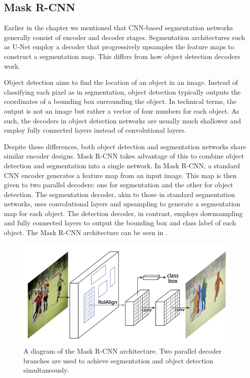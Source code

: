 \subsection{Mask R-CNN}

Earlier in the chapter we mentioned that CNN-based segmentation networks generally consist of encoder and decoder stages. Segmentation architectures such as U-Net employ a decoder that progressively upsamples the feature maps to construct a segmentation map. This differs from how object detection decoders work.

Object detection aims to find the location of an object in an image. Instead of classifying each pixel as in segmentation, object detection typically outputs the coordinates of a bounding box surrounding the object. In technical terms, the output is not an image but rather a vector of four numbers for each object. As such, the decoders in object detection networks are usually much shallower and employ fully connected layers instead of convolutional layers.

Despite these differences, both object detection and segmentation networks share similar encoder designs. Mask R-CNN \cite{heMaskRCNN2017b} takes advantage of this to combine object detection and segmentation into a single network. In Mask R-CNN, a standard CNN encoder generates a feature map from an input image. This map is then given to two parallel decoders: one for segmentation and the other for object detection. The segmentation decoder, akin to those in standard segmentation networks, uses convolutional layers and upsampling to generate a segmentation map for each object. The detection decoder, in contrast, employs downsampling and fully connected layers to output the bounding box and class label of each object. The Mask R-CNN architecture can be seen in .

 \begin{figure}[h!]
 \centering
 \includegraphics[width=0.6\linewidth]{images/maskrcnn-arch}
 \caption{A diagram of the Mask R-CNN architecture. Two parallel decoder branches are used to achieve segmentation and object detection simultaneously. \cite{heMaskRCNN2017b}}
 \label{fig:maskrcnn-arch}
 \end{figure}

